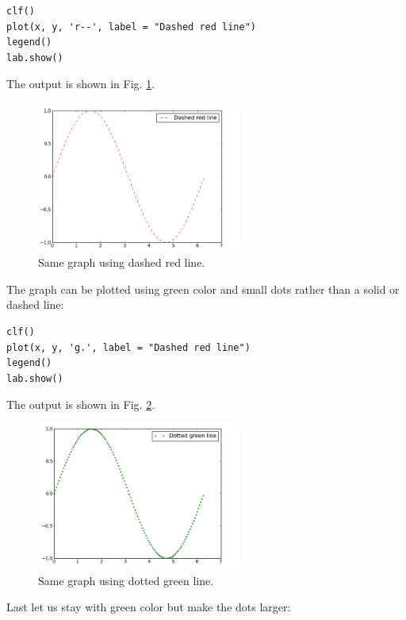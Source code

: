 \begin{verbatim}
clf()
plot(x, y, 'r--', label = "Dashed red line")
legend()
lab.show()
\end{verbatim}
The output is shown in Fig. \ref{fig:plot3}.\\[-7mm]


\begin{figure}[!ht]
\begin{center}
\includegraphics[width=0.6\textwidth]{imgp/plot3.png}
\end{center}
\vspace{-6mm}
\caption{Same graph using dashed red line.}
\vspace{-1cm}
\label{fig:plot3}
\end{figure}
\newpage
\noindent
The graph can be plotted using green color and small dots rather than 
a solid or dashed line:

\begin{verbatim}
clf()
plot(x, y, 'g.', label = "Dashed red line")
legend()
lab.show()
\end{verbatim}
The output is shown in Fig. \ref{fig:plot4}.

\begin{figure}[!ht]
\begin{center}
\includegraphics[width=0.6\textwidth]{imgp/plot4.png}
\end{center}
\vspace{-6mm}
\caption{Same graph using dotted green line.}
\label{fig:plot4}
\end{figure}
\noindent
\noindent
Last let us stay with green color but make the dots larger:

